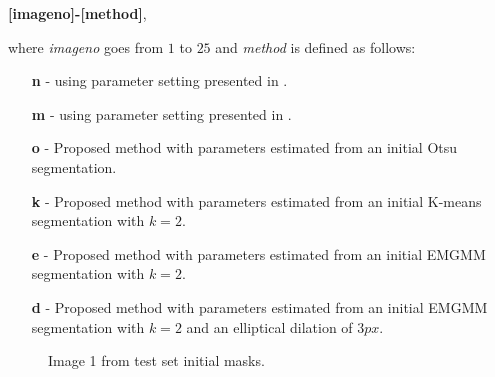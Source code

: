 \textbf{[imageno]-[method]}, 

where \textit{imageno} goes from $1$ to $25$ and \textit{method} is defined as follows:
\begin{enumerate}
	\item [\textbf{n}] - using parameter setting presented in \citep{ElZehiry2007}.
	\item [\textbf{m}] - using parameter setting presented in \citep{Maska2013}.
	\item [\textbf{o}] - Proposed method with parameters estimated from an initial Otsu segmentation.
	\item [\textbf{k}] - Proposed method with parameters estimated from an initial K-means segmentation with $k=2$.
	\item [\textbf{e}] - Proposed method with parameters estimated from an initial EMGMM segmentation with $k=2$.
	\item [\textbf{d}] - Proposed method with parameters estimated from an initial EMGMM segmentation with $k=2$ and an elliptical dilation of $3px$.
\end{enumerate}

\clearpage
\begin{figure}[!h]
	\centering
	\caption{Image 1 from test set  initial masks.}
	\label{fig:test188}
\end{figure}

